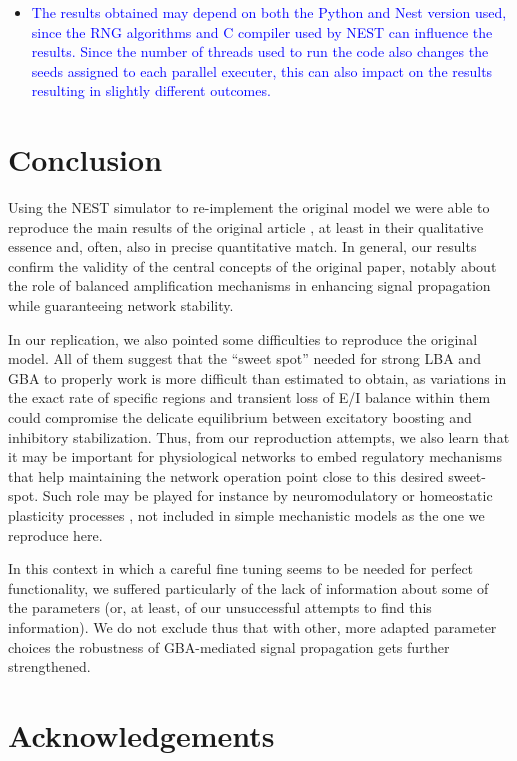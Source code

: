 \begin{itemize}
    \item \textcolor{blue}{The results obtained may depend on both the Python and Nest version used, since the RNG algorithms and C compiler used by NEST can influence the results. Since the number of threads used to run the code also changes the seeds assigned to each parallel executer, this can also impact on the results resulting in slightly different outcomes.}
    
\end{itemize}

\section{Conclusion}

Using the NEST simulator to re-implement  the original model we were able to reproduce the main results of the original article \cite{joglekar2018inter}, at least in their qualitative essence and, often, also in precise quantitative match. In general, our results confirm the validity of the central concepts of the original paper, notably about the role of balanced amplification mechanisms in enhancing signal propagation while guaranteeing network stability. 

In our replication, we also pointed some difficulties to reproduce the original model. All of them suggest that the ``sweet spot'' needed for strong LBA and GBA to properly work is more difficult than estimated to obtain, as variations in the exact rate of specific regions and transient loss of E/I balance within them could compromise the delicate equilibrium between excitatory boosting and inhibitory stabilization. Thus, from our reproduction attempts, we also learn that it may be important for physiological networks to embed regulatory mechanisms that help maintaining the network operation point close to this desired sweet-spot. Such role may be played for instance by neuromodulatory or homeostatic plasticity processes \cite{ShineTICS, SjostromTINS}, not included in simple mechanistic models as the one we reproduce here.

In this context in which a careful fine tuning seems to be needed for perfect functionality, we suffered particularly of the lack of information about some of the parameters (or, at least, of our unsuccessful attempts to find this information). We do not exclude thus that with other, more adapted parameter choices the robustness of GBA-mediated signal propagation gets further strengthened.

\section{Acknowledgements}


